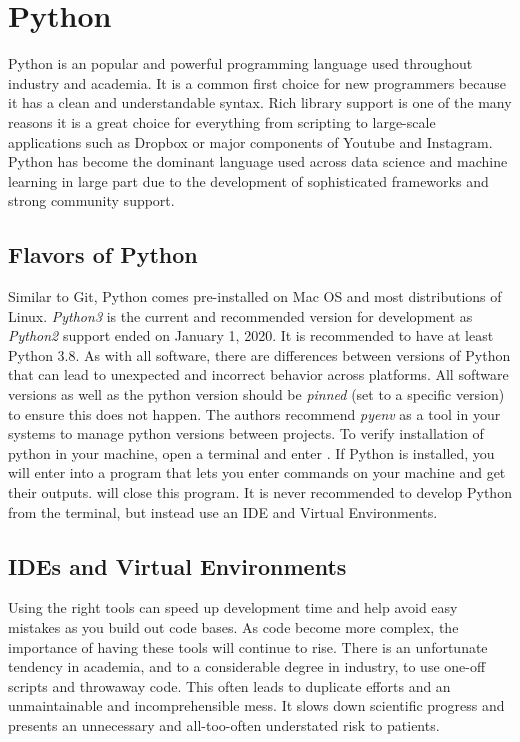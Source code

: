 \section{Python}

Python is an popular and powerful programming language used throughout industry and academia.
It is a common first choice for new programmers because it has a clean and understandable syntax.
Rich library support is one of the many reasons it is a great choice for everything from scripting to large-scale applications such as Dropbox or major components of Youtube and Instagram.
Python has become the dominant language used across data science and machine learning in large part due to the development of sophisticated frameworks and strong community support.

\subsection{Flavors of Python}

Similar to Git, Python comes pre-installed on Mac OS and most distributions of Linux.
\textit{Python3} is the current and recommended version for development as \textit{Python2} support ended on January 1, 2020.
It is recommended to have at least Python 3.8. As with all software, there are differences between versions of Python that can lead to unexpected and incorrect behavior across platforms.
All software versions as well as the python version should be \textit{pinned} (set to a specific version) to ensure this does not happen.
The authors recommend \textit{pyenv} as a tool in your systems to manage python versions between projects.
To verify installation of python in your machine, open a terminal and enter .
If Python is installed, you will enter into a program that lets you enter commands on your machine and get their outputs.  will close this program.
It is never recommended to develop Python from the terminal, but instead use an IDE and Virtual Environments.

\subsection{IDEs and Virtual Environments}

Using the right tools can speed up development time and help avoid easy mistakes as you build out code bases.
As code become more complex, the importance of having these tools will continue to rise.
There is an unfortunate tendency in academia, and to a considerable degree in industry, to use one-off scripts and throwaway code.
This often leads to duplicate efforts and an unmaintainable and incomprehensible mess.
It slows down scientific progress and presents an unnecessary and all-too-often understated risk to patients.


